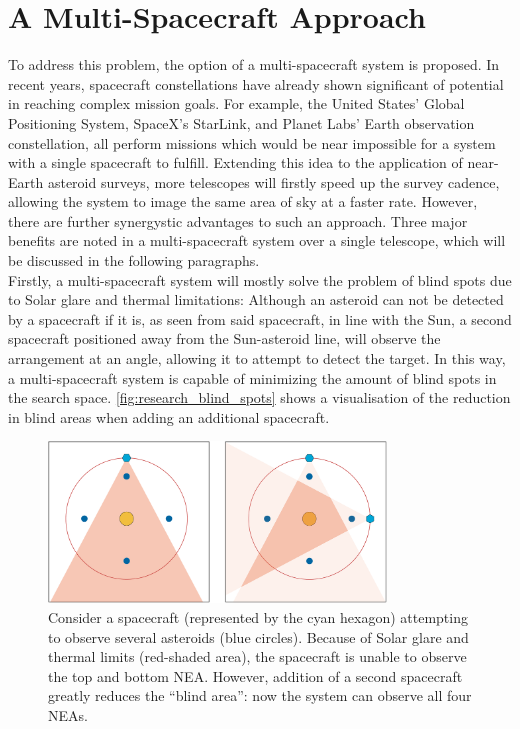 \section{A Multi-Spacecraft Approach}
\label{sec:researchmultispacecraft}
To address this problem, the option of a multi-spacecraft system is proposed. In recent years, spacecraft constellations have already shown significant of potential in reaching complex mission goals. For example, the United States' Global Positioning System, SpaceX's StarLink, and Planet Labs' Earth observation constellation, all perform missions which would be near impossible for a system with a single spacecraft to fulfill. Extending this idea to the application of near-Earth asteroid surveys, more telescopes will firstly speed up the survey cadence, allowing the system to image the same area of sky at a faster rate. However, there are further synergystic advantages to such an approach. Three major benefits are noted in a multi-spacecraft system over a single telescope, which will be discussed in the following paragraphs.\\

Firstly, a multi-spacecraft system will mostly solve the problem of blind spots due to Solar glare and thermal limitations: Although an asteroid can not be detected by a spacecraft if it is, as seen from said spacecraft, in line with the Sun, a second spacecraft positioned away from the Sun-asteroid line, will observe the arrangement at an angle, allowing it to attempt to detect the target. In this way, a multi-spacecraft system is capable of minimizing the amount of blind spots in the search space. \autoref{fig:research_blind_spots} shows a visualisation of the reduction in blind areas when adding an additional spacecraft.\\

\begin{figure}[htbp]
 \centering
 \includegraphics[width=0.8\textwidth]{img/research_blind_spots.png}
 \caption{Consider a spacecraft (represented by the cyan hexagon) attempting to observe several asteroids (blue circles). Because of Solar glare and thermal limits (red-shaded area), the spacecraft is unable to observe the top and bottom NEA. However, addition of a second spacecraft greatly reduces the ``blind area'': now the system can observe all four NEAs.}
 \label{fig:research_blind_spots}
\end{figure}


